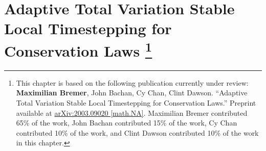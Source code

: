 


\chapter[Adaptive Total Variation Stable Local Timestepping for Conservation Laws]{Adaptive Total Variation Stable Local Timestepping for Conservation Laws%
\footnote{%
This chapter is based on the following publication currently under review: {\bf Maximilian Bremer}, John Bachan, Cy Chan, Clint Dawson. ``Adaptive Total Variation Stable Local Timestepping for Conservation Laws.'' Preprint available at \href{https://arxiv.org/abs/2003.09020}{arXiv:2003.09020 [math.NA]}. Maximilian Bremer contributed 65\% of the work, John Bachan contributed 15\% of the work, Cy Chan contributed 10\% of the work, and Clint Dawson contributed 10\% of the work in this chapter.}}
\label{ch:lts}








